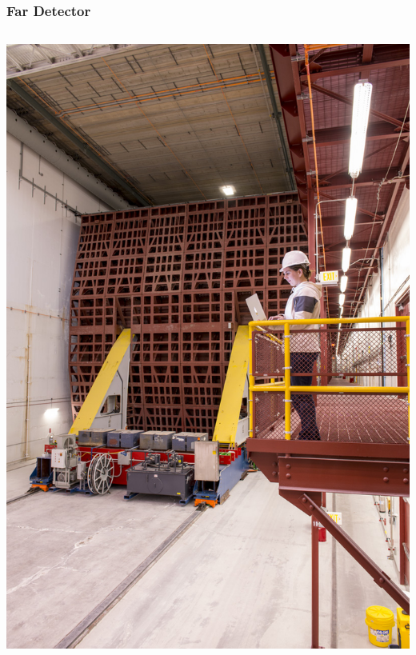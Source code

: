 \documentclass[10pt,professionalfonts,xcolor=table]{beamer}
\begin{document}
\frame
{
  \frametitle{Far Detector}
  \centering
\begin{columns}[c]
\centering
 \includegraphics[height=0.85\textheight]{figures/det_photos/det_front.jpg}


\end{columns}}
\end{document}
